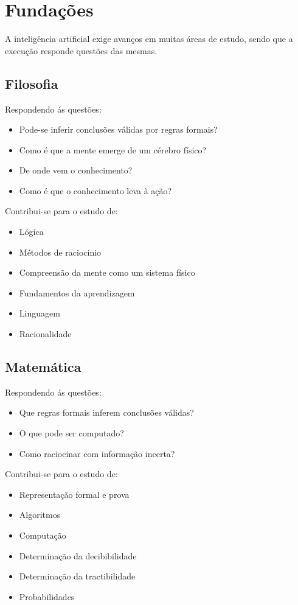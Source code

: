 \documentclass[]{report}
\begin{document}
\section{Fundações}
A inteligência artificial exige avanços em muitas áreas de estudo, sendo que a execução responde questões das mesmas.
\begin{multicols}{2}
\subsection{Filosofia}
Respondendo ás questões:
\begin{itemize}
\item Pode-se inferir conclusões válidas por regras formais?
\item Como é que a mente emerge de um cérebro físico?
\item De onde vem o conhecimento?
\item Como é que o conhecimento leva à ação?
\end{itemize}
Contribui-se para o estudo de:
\begin{itemize}
\item Lógica
\item Métodos de raciocínio
\item Compreensão da mente como um sistema físico
\item Fundamentos da aprendizagem
\item Linguagem
\item Racionalidade
\end{itemize}
\subsection{Matemática}
Respondendo ás questões:
\begin{itemize}
\item Que regras formais inferem conclusões válidas?
\item O que pode ser computado?
\item Como raciocinar com informação incerta?
\end{itemize}
Contribui-se para o estudo de:
\begin{itemize}
\item Representação formal e prova
\item Algoritmos
\item Computação
\item Determinação da decibibilidade
\item Determinação da tractibilidade %
\item Probabilidades
\end{itemize}

\end{multicols}
\end{document}
